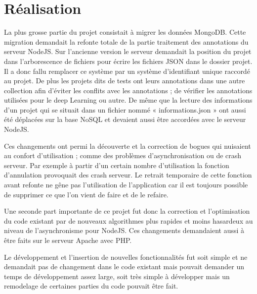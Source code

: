 \documentclass[12pt]{article}
\begin{document}
\section{Réalisation}
La plus grosse partie du projet consistait à migrer les données MongoDB. Cette migration demandait la refonte totale de la partie traitement des annotations du serveur NodeJS. Sur l’ancienne version le serveur demandait la position du projet dans l’arborescence de fichiers pour écrire les fichiers JSON dans le dossier projet. Il a donc fallu remplacer ce système par un système d’identifiant unique raccordé au projet. De plus les projets dits de tests ont leurs annotations dans une autre collection afin d’éviter les conflits avec les annotations ; de vérifier les annotations utilisées pour le deep Learning ou autre. De même que la lecture des informations d’un projet qui se situait dans un fichier nommé « informations.json » ont aussi été déplacées sur la base NoSQL et devaient aussi être accordées avec le serveur NodeJS.
\par
Ces changements ont permi la découverte et la correction de bogues qui nuisaient au confort d’utilisation ; comme des problèmes d’asynchronisation ou de crash serveur.
Par exemple à partir d’un certain nombre d’utilisation la fonction d’annulation provoquait des crash serveur. Le retrait temporaire de cette fonction avant refonte ne gêne pas l’utilisation de l’application car il est toujours possible de supprimer ce que l’on vient de faire et de le refaire.
\par
Une seconde part importante de ce projet fut donc la correction et l’optimisation du code existant par de nouveaux algorithmes plus rapides et moins hasardeux au niveau de l’asynchronisme pour NodeJS. Ces changements demandaient aussi à être faits sur le serveur Apache avec PHP.
\par
Le développement et l’insertion de nouvelles fonctionnalités fut soit simple et ne demandait pas de changement dans le code existant mais pouvait demander un temps de développement assez large, soit très simple à développer mais un remodelage de certaines parties du code pouvait être fait.

\newpage
\end{document}
